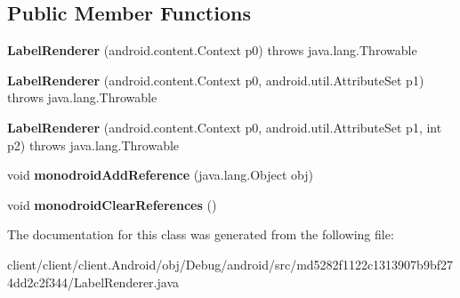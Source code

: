 \subsection*{Public Member Functions}
\begin{DoxyCompactItemize}
\item 
\hypertarget{classmd5282f1122c1313907b9bf274dd2c2f344_1_1LabelRenderer_ab3e9833d609fed05c07fb9b3fc43f5f7}{}{\bfseries Label\+Renderer} (android.\+content.\+Context p0)  throws java.\+lang.\+Throwable 	\label{classmd5282f1122c1313907b9bf274dd2c2f344_1_1LabelRenderer_ab3e9833d609fed05c07fb9b3fc43f5f7}

\item 
\hypertarget{classmd5282f1122c1313907b9bf274dd2c2f344_1_1LabelRenderer_a1594c0aaeb3c02976dc3ae3a208e635f}{}{\bfseries Label\+Renderer} (android.\+content.\+Context p0, android.\+util.\+Attribute\+Set p1)  throws java.\+lang.\+Throwable 	\label{classmd5282f1122c1313907b9bf274dd2c2f344_1_1LabelRenderer_a1594c0aaeb3c02976dc3ae3a208e635f}

\item 
\hypertarget{classmd5282f1122c1313907b9bf274dd2c2f344_1_1LabelRenderer_a7af5dc590f95e8da2bcefe784fbbb005}{}{\bfseries Label\+Renderer} (android.\+content.\+Context p0, android.\+util.\+Attribute\+Set p1, int p2)  throws java.\+lang.\+Throwable 	\label{classmd5282f1122c1313907b9bf274dd2c2f344_1_1LabelRenderer_a7af5dc590f95e8da2bcefe784fbbb005}

\item 
\hypertarget{classmd5282f1122c1313907b9bf274dd2c2f344_1_1LabelRenderer_ab7924f1f15805a32b7dc970971a71c76}{}void {\bfseries monodroid\+Add\+Reference} (java.\+lang.\+Object obj)\label{classmd5282f1122c1313907b9bf274dd2c2f344_1_1LabelRenderer_ab7924f1f15805a32b7dc970971a71c76}

\item 
\hypertarget{classmd5282f1122c1313907b9bf274dd2c2f344_1_1LabelRenderer_a962460e44a90efea5196754aacf78162}{}void {\bfseries monodroid\+Clear\+References} ()\label{classmd5282f1122c1313907b9bf274dd2c2f344_1_1LabelRenderer_a962460e44a90efea5196754aacf78162}

\end{DoxyCompactItemize}


The documentation for this class was generated from the following file\+:\begin{DoxyCompactItemize}
\item 
client/client/client.\+Android/obj/\+Debug/android/src/md5282f1122c1313907b9bf274dd2c2f344/Label\+Renderer.\+java\end{DoxyCompactItemize}
